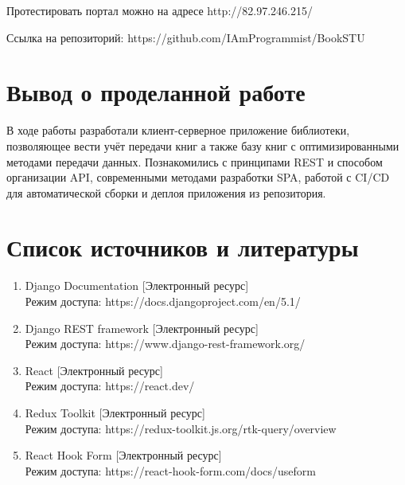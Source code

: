 \documentclass[a4paper,14pt]{extarticle}
\begin{document}
Протестировать портал можно на адресе http://82.97.246.215/

Ссылка на репозиторий: https://github.com/IAmProgrammist/BookSTU

\section{Вывод о проделанной работе}
В ходе работы разработали клиент-серверное приложение библиотеки, позволяющее
вести учёт передачи книг а также базу книг с оптимизированными методами передачи
данных. Познакомились с принципами REST и способом организации API, 
современными методами разработки SPA, работой с CI/CD для автоматической сборки
и деплоя приложения из репозитория.
\newpage

\section{Список источников и литературы}
\begin{enumerate}
    \item Django Documentation [Электронный ресурс] \\Режим доступа: https://docs.djangoproject.com/en/5.1/
    \item Django REST framework [Электронный ресурс] \\Режим доступа: https://www.django-rest-framework.org/
    \item React [Электронный ресурс] \\Режим доступа: https://react.dev/
    \item Redux Toolkit [Электронный ресурс] \\Режим доступа: https://redux-toolkit.js.org/rtk-query/overview
    \item React Hook Form [Электронный ресурс] \\Режим доступа: https://react-hook-form.com/docs/useform
\end{enumerate}
\end{document}
